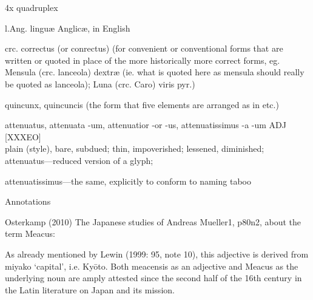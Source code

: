 4x quadruplex


l.Ang. linguæ Anglicæ, in English


crc. correctus (or conrectus) (for convenient or conventional forms that
are written or quoted in place of the more historically more correct
forms, eg. {} {} Mensula (crc. lanceola) dextræ (ie. what is quoted
here as {} {\mktsStyleItalic{}mensula\/} should really be quoted as {} {\mktsStyleItalic{}lanceola\/});
{} {} Luna (crc. Caro) viris pyr.)


quincunx, quincuncis (the form that five elements are arranged as in {} etc.)


{\mktsStyleBold{}attenuatus, attenuata -um, attenuatior -or -us, attenuatissimus -a -um  ADJ}  [XXXEO]\\
plain (style), bare, subdued; thin, impoverished; lessened, diminished;\\

attenuatus—reduced version of a glyph;


attenuatissimus—the same, explicitly to conform to naming taboo



{\mktsHThree{}Annotations\mktsHThreeBeg}%

{\mktsStyleLinklabel{}Osterkamp (2010) {\mktsStyleItalic{}The Japanese studies of Andreas Mueller\/}}{\mktsEnStyleMarkMain{}1},
p80n2, about the term {\mktsStyleItalic{}Meacus\/}:

\begin{mktsEnvBlockquote}As already mentioned by Lewin (1999: 95, note 10), this adjective is derived
 from miyako {} ‘capital’, i.e. Kyōto.  Both {\mktsStyleItalic{}meacensis\/} as an adjective and
 {\mktsStyleItalic{}Meacus\/} as the underlying noun are amply attested since the second half of
 the 16th century in the Latin literature on Japan and its mission.

\end{mktsEnvBlockquote}

